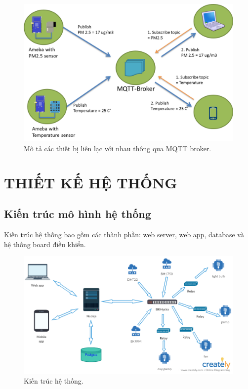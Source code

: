\documentclass[a4paper,12pt,oneside]{article}
\begin{document}
\begin{center}
\begin{figure}[htp]
\begin{center}
\includegraphics[scale=.7]{hinh/mqtt.png}
\end{center}
\caption{Mô tả các thiết bị liên lạc với nhau thông qua MQTT broker.}
\end{figure}
\end{center}

\newpage
\section{THIẾT KẾ HỆ THỐNG}
\subsection{Kiến trúc mô hình hệ thống}
\noindent Kiến trúc hệ thống bao gồm các thành phần: web server, web app, database và hệ thống board điều khiển. 

\begin{center}
\begin{figure}[htp]
\begin{center}
\includegraphics[scale=.5]{hinh/system.png}
\end{center}
\caption{Kiến trúc hệ thống.}

\end{figure}
\end{center}
\end{document}
